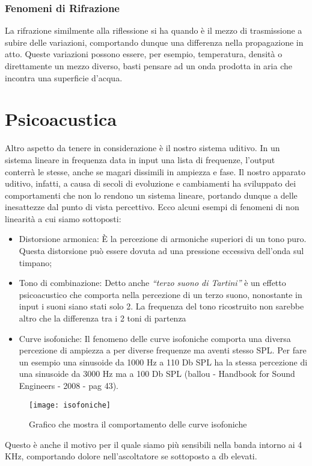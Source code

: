 \subsubsection{Fenomeni di Rifrazione}

La rifrazione similmente alla riflessione si ha quando è il mezzo di trasmissione a subire delle variazioni, comportando dunque una differenza nella propagazione in atto. Queste variazioni possono essere, per esempio, temperatura, densità o direttamente un mezzo diverso, basti pensare ad un onda prodotta in aria che incontra una superficie d’acqua.

\section{Psicoacustica}

Altro aspetto da tenere in considerazione è il nostro sistema uditivo. In un sistema lineare in frequenza data in input una lista di frequenze, l’output conterrà le stesse, anche se magari dissimili in ampiezza e fase.
Il nostro apparato uditivo, infatti, a causa di secoli di evoluzione e cambiamenti ha sviluppato dei comportamenti che non lo rendono un sistema lineare, portando dunque a delle inesattezze dal punto di vista percettivo.
Ecco alcuni esempi di fenomeni di non linearità a cui siamo sottoposti:

\begin{itemize}
\item Distorsione armonica:
È la percezione di armoniche superiori di un tono puro. Questa distorsione può essere dovuta ad una pressione eccessiva dell’onda sul timpano;
\item Tono di combinazione:
Detto anche \textit{“terzo suono di Tartini”} è un effetto psicoacustico che comporta nella percezione di un terzo suono, nonostante in input i suoni siano stati solo 2.
La frequenza del tono ricostruito non sarebbe altro che la differenza tra i 2 toni di partenza
\item Curve isofoniche:
Il fenomeno delle curve isofoniche comporta una diversa percezione di ampiezza a per diverse frequenze ma aventi stesso SPL. Per fare un esempio una sinusoide da 1000 Hz a 110 Db SPL ha la stessa percezione di una sinusoide da 3000 Hz ma a 100 Db SPL (ballou - Handbook for Sound Engineers - 2008 - pag 43).
\end{itemize}

\begin{figure}[h]
\centering
\texttt{[image: isofoniche]}
\caption{Grafico che mostra il comportamento delle curve isofoniche}
\label{fig:isofoniche}
\end{figure}
Questo è anche il motivo per il quale siamo più sensibili nella banda intorno ai 4 KHz, comportando dolore nell’ascoltatore se sottoposto a db elevati.
